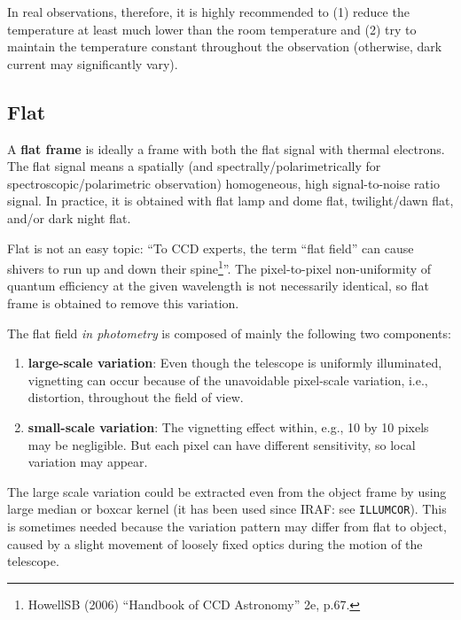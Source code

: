 In real observations, therefore, it is highly recommended to (1) reduce the temperature at least much lower than the room temperature and (2) try to maintain the temperature constant throughout the observation (otherwise, dark current may significantly vary).


\subsection{Flat} \label{ss: calib-flat}
\begin{defn}[Flat]
A \textbf{flat frame} is ideally a frame with both the flat signal with thermal electrons. The flat signal means a spatially (and spectrally/polarimetrically for spectroscopic/polarimetric observation) homogeneous, high signal-to-noise ratio signal. In practice, it is obtained with flat lamp and dome flat, twilight/dawn flat, and/or dark night flat.
\end{defn}

Flat is not an easy topic: ``To CCD experts, the term ``flat field'' can cause shivers to run up and down their spine\footnote{HowellSB (2006) ``Handbook of CCD Astronomy'' 2e, p.67.}''. The pixel-to-pixel non-uniformity of quantum efficiency at the given wavelength is not necessarily identical, so flat frame is obtained to remove this variation.

The flat field \emph{in photometry} is composed of mainly the following two components:
\begin{enumerate}
\item \textbf{large-scale variation}: Even though the telescope is uniformly illuminated, vignetting can occur because of the unavoidable pixel-scale variation, i.e., distortion, throughout the field of view.
\item \textbf{small-scale variation}: The vignetting effect within, e.g., 10 by 10 pixels may be negligible. But each pixel can have different sensitivity, so local variation may appear.
\end{enumerate}

The large scale variation could be extracted even from the object frame by using large median or boxcar kernel (it has been used since IRAF: see \texttt{ILLUMCOR}). This is sometimes needed because the variation pattern may differ from flat to object, caused by a slight movement of loosely fixed optics during the motion of the telescope.

